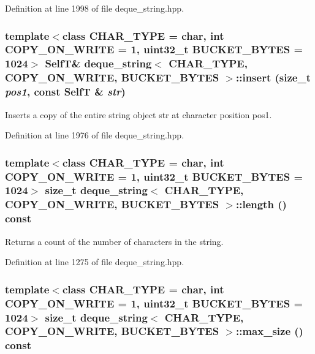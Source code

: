 Definition at line 1998 of file deque\_\-string.hpp.\hypertarget{classdeque__string_9a83bbe40adafff72391797edcce5b31}{
\subsubsection[{insert}]{\setlength{\rightskip}{0pt plus 5cm}template$<$class CHAR\_\-TYPE  = char, int COPY\_\-ON\_\-WRITE = 1, uint32\_\-t BUCKET\_\-BYTES = 1024$>$ {\bf SelfT}\& {\bf deque\_\-string}$<$ CHAR\_\-TYPE, COPY\_\-ON\_\-WRITE, BUCKET\_\-BYTES $>$::insert (size\_\-t {\em pos1}, \/  const {\bf SelfT} \& {\em str})}}
\label{classdeque__string_9a83bbe40adafff72391797edcce5b31}


Inserts a copy of the entire string object str at character position pos1. 

Definition at line 1976 of file deque\_\-string.hpp.\hypertarget{classdeque__string_4cc04b6ba64f69b943b7ece1aa1e0f80}{
\subsubsection[{length}]{\setlength{\rightskip}{0pt plus 5cm}template$<$class CHAR\_\-TYPE  = char, int COPY\_\-ON\_\-WRITE = 1, uint32\_\-t BUCKET\_\-BYTES = 1024$>$ size\_\-t {\bf deque\_\-string}$<$ CHAR\_\-TYPE, COPY\_\-ON\_\-WRITE, BUCKET\_\-BYTES $>$::length () const}}
\label{classdeque__string_4cc04b6ba64f69b943b7ece1aa1e0f80}


Returns a count of the number of characters in the string. 

Definition at line 1275 of file deque\_\-string.hpp.\hypertarget{classdeque__string_c2e1561b8bb76f37f0e0f060fe520982}{
\subsubsection[{max\_\-size}]{\setlength{\rightskip}{0pt plus 5cm}template$<$class CHAR\_\-TYPE  = char, int COPY\_\-ON\_\-WRITE = 1, uint32\_\-t BUCKET\_\-BYTES = 1024$>$ size\_\-t {\bf deque\_\-string}$<$ CHAR\_\-TYPE, COPY\_\-ON\_\-WRITE, BUCKET\_\-BYTES $>$::max\_\-size () const}}
\label{classdeque__string_c2e1561b8bb76f37f0e0f060fe520982}


